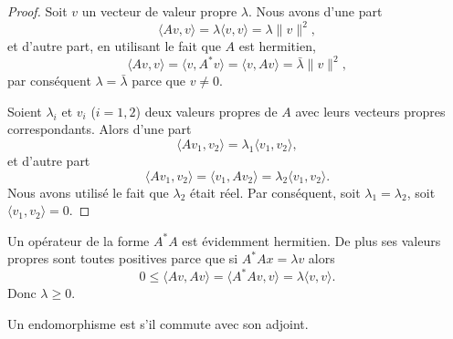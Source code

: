 \begin{proof}
    Soit \( v\) un vecteur de valeur propre \( \lambda\). Nous avons d'une part 
    \begin{equation}
        \langle Av, v\rangle =\lambda\langle v, v\rangle =\lambda\| v \|^2,
    \end{equation}
    et d'autre part, en utilisant le fait que \( A\) est hermitien,
    \begin{equation}
        \langle Av, v\rangle =\langle v, A^*v\rangle =\langle v, Av\rangle =\bar\lambda\| v \|^2,
    \end{equation}
    par conséquent \( \lambda=\bar\lambda\) parce que \( v\neq 0\).

    Soient \( \lambda_i\) et \( v_i\) (\( i=1,2\)) deux valeurs propres de \( A\) avec leurs vecteurs propres correspondants. Alors d'une part
    \begin{equation}
        \langle Av_1, v_2\rangle =\lambda_1\langle v_1, v_2\rangle ,
    \end{equation}
    et d'autre part
    \begin{equation}
        \langle Av_1, v_2\rangle =\langle v_1, Av_2\rangle =\lambda_2\langle v_1, v_2\rangle .
    \end{equation}
    Nous avons utilisé le fait que \( \lambda_2\) était réel. Par conséquent, soit \( \lambda_1=\lambda_2\), soit \( \langle v_1, v_2\rangle =0\).
\end{proof}

\begin{remark}      \label{REMooMLBCooTuKFmz}
    Un opérateur de la forme \( A^*A\) est évidemment hermitien. De plus ses valeurs propres sont toutes positives parce que si \( A^*Ax=\lambda v\) alors
    \begin{equation}
        0\leq \langle Av, Av\rangle =\langle A^*Av, v\rangle =\lambda\langle v, v\rangle .
    \end{equation}
    Donc \( \lambda\geq 0\).
\end{remark}

\begin{definition}  \label{DefWQNooKEeJzv}
    Un endomorphisme est  s'il commute avec son adjoint.
\end{definition}

